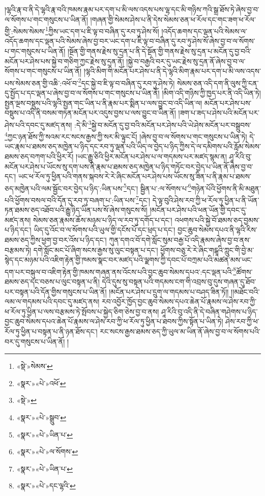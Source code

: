 །ལྷའི་རྣ་བ་ནི་དེ་ལྷའི་རྣ་བའི་ཁམས་རྣམ་པར་དག་པ་མི་ལས་འདས་པས་ལྷ་དང་མི་གཉིས་ཀའི་སྒྲ་ཐོས་ཏེ་ཞེས་བྱ་བ་ལ་སོགས་པ་གང་གསུངས་པ་ཡིན་ནོ། །གཞན་གྱི་སེམས་ཤེས་པ་ནི་དེས་སེམས་ཅན་ཕ་རོལ་དང་གང་ཟག་ཕ་རོལ་གྱི་:སེམས་སེམས་\footnote{«སྡེ་»སེམས་}ཀྱིས་ཡང་དག་པ་ཇི་ལྟ་བ་བཞིན་དུ་རབ་ཏུ་ཤེས་སོ། །འདོད་ཆགས་དང་ལྡན་པའི་སེམས་ལ་འདོད་ཆགས་དང་ལྡན་པའི་སེམས་ཞེས་བྱ་བར་ཡང་དག་པ་ཇི་ལྟ་བ་བཞིན་དུ་རབ་ཏུ་ཤེས་སོ་ཞེས་བྱ་བ་ལ་སོགས་པ་གང་གསུངས་པ་ཡིན་ནོ། །སྔོན་གྱི་གནས་རྗེས་སུ་དྲན་པ་ནི་དེ་སྔོན་གྱི་གནས་རྗེས་སུ་དྲན་པ་མངོན་དུ་བྱ་བའི་མངོན་པར་ཤེས་པས་སྐྱེ་བ་གཅིག་ཀྱང་རྗེས་སུ་དྲན་ནོ། །སྐྱེ་བ་བརྒྱའི་བར་དུ་ཡང་རྗེས་སུ་དྲན་ནོ་ཞེས་བྱ་བ་ལ་སོགས་པ་གང་གསུངས་པ་ཡིན་ནོ། །ལྷའི་མིག་གི་མངོན་པར་ཤེས་པ་ནི་དེ་ལྷའི་མིག་རྣམ་པར་དག་པ་མི་ལས་འདས་པས་སེམས་ཅན་གྱི་འཆི་:འཕོ་བ་\footnote{«སྣར་»«པེ་»འཕོ་}དང་སྐྱེ་བ་ཇི་ལྟ་བ་བཞིན་དུ་རབ་ཏུ་ཤེས་ཏེ། སེམས་ཅན་འདི་དག་ནི་ལུས་ཀྱི་ངན་དུ་སྤྱོད་པ་དང་ལྡན་པ་ཞེས་བྱ་བ་ལ་སོགས་པ་གང་གསུངས་པ་ཡིན་ནོ། །མིག་འདི་གཉིས་ཀྱི་ཁྱད་པར་ནི་འདི་ཡིན་ཏེ། སྤྱན་ལྔས་བསྡུས་པའི་ལྷའི་སྤྱན་གང་ཡིན་པ་ནི་རྣམ་པར་སྨིན་པ་ལས་བྱུང་བ་འདི་ཡིན་ལ། མངོན་པར་ཤེས་པས་བསྡུས་པ་འདི་ནི་བསམ་གཏན་མངོན་པར་འདུས་བྱས་པ་ལས་བྱུང་བ་ཡིན་ནོ། །ཟག་པ་ཟད་པ་ཤེས་པའི་མངོན་པར་ཤེས་པའི་དབང་དུ་མཛད་ནས། :དེ་མི་\footnote{«སྡེ་»}སྐྱེ་བ་མངོན་དུ་བྱ་བའི་མངོན་པར་ཤེས་པའི་ཡེ་ཤེས་མངོན་པར་བསྒྲུབས་\footnote{«སྣར་»«པེ་»སྒྲུབ་}ཀྱང་ཉན་ཐོས་ཀྱི་སའམ་རང་སངས་རྒྱས་ཀྱི་སར་མི་ལྟུང་ངོ། །ཞེས་བྱ་བ་ལ་སོགས་པ་གང་གསུངས་པ་ཡིན་ཏེ། དེ་ཡང་རྣམ་པ་ཐམས་ཅད་མཁྱེན་པ་ཉིད་དང་རབ་ཏུ་ལྡན་པའི་ཡིད་ལ་བྱེད་པ་ཉིད་ཀྱིས་དེ་ལ་དམིགས་པའི་རློམ་སེམས་ཐམས་ཅད་བཀག་པའི་ཕྱིར་རོ། །ཡང་རྒྱུ་ཅིའི་ཕྱིར་མངོན་པར་ཤེས་པ་ལ་གདམས་པར་མཛད་སྙམ་ན། ཤཱ་རིའི་བུ་མངོན་པར་ཤེས་པ་ཡོངས་སུ་དག་པས་ནི་རྣམ་པ་ཐམས་ཅད་མཁྱེན་པ་ཉིད་གཏོང་བར་བྱེད་པ་ཡིན་ནོ་ཞེས་བྱ་བ་དང་། ཡང་ཕ་རོལ་ཏུ་ཕྱིན་པའི་གནས་སྐབས་རེ་རེ་ཞིང་མངོན་པར་ཤེས་པས་ཡོངས་སུ་ཟིན་པ་ནི་རྣམ་པ་ཐམས་ཅད་མཁྱེན་པའི་ལམ་སྦྱོང་བར་བྱེད་པ་ཉིད་:ཡིན་པས་\footnote{«སྣར་»«པེ་»ཡིན་པ་}དང་། སྦྱིན་པ་:ལ་སོགས་པ་\footnote{«སྣར་»«པེ་»ལ་སོགས་}གཉེན་པོའི་ཕྱོགས་ནི་མི་མཐུན་པའི་ཕྱོགས་བསལ་བའི་དོན་དུ་རབ་ཏུ་བཞག་པ་:ཡིན་པས་\footnote{«སྣར་»«པེ་»ཡིན་པ་}དང་། དེ་ལྟ་བུའི་ཤེས་རབ་ཀྱི་ཕ་རོལ་ཏུ་ཕྱིན་པ་ནི་ཡོན་ཏན་ཐམས་ཅད་འཐོབ་པའི་རྒྱུ་ཉིད་ཡིན་པས་སོ་ཞེས་གསུངས་སོ། །མངོན་པར་ཤེས་པའི་ཕན་ཡོན་གྱི་དབང་དུ་མཛད་ནས། སེམས་ཅན་རྣམས་ཆོས་མཉམ་པ་ཉིད་ལ་རབ་ཏུ་དགོད་པ་དང་། འཕགས་པའི་སྐྱེ་བོ་ཐམས་ཅད་བྱམས་པ་ཉིད་དང་། ཡིད་དུ་འོང་བ་ལ་སོགས་པའི་ཡུལ་གྱི་དངོས་པོ་དང་ཕྲད་པ་དང་། བྱང་ཆུབ་སེམས་དཔའ་ནི་ལྷའི་རིས་ཐམས་ཅད་ཀྱིས་ཕྱག་བྱ་བར་འོས་པ་ཉིད་དང་། ཀུན་དགའ་བོ་དགེ་སློང་སུམ་བརྒྱ་པོ་འདི་རྣམས་ཞེས་བྱ་བ་ནས་བརྩམས་ཏེ། དགེ་སློང་མང་པོ་ཞིག་སངས་རྒྱས་སུ་ལུང་བསྟན་པ་དང་། ཕྱོགས་བཅུ་རེ་རེ་ཞིང་གངྒཱའི་ཀླུང་གི་བྱེ་མ་སྙེད་དང་མཉམ་པའི་འཇིག་རྟེན་གྱི་ཁམས་སྣང་བར་མཛད་པའི་ལྗགས་ཀྱི་དབང་པོ་བཀྲམ་པའི་མཚན་མས་ཡང་དག་པར་བསྐུལ་བ་འཇིག་རྟེན་གྱི་ཁམས་གཞན་ནས་འོངས་པའི་བྱང་ཆུབ་སེམས་དཔའ་:དང་ལྡན་པའི་\footnote{«སྣར་»«པེ་»དང་ལྷའི་}ཚོགས་ཐམས་ཅད་དང་བཅས་པ་ལུང་བསྟན་པ་ནི། དེའི་དུས་སུ་བསྟན་པའི་གདམས་ངག་གི་འབྲས་བུ་དུས་གཞན་དུ་ཐོབ་པར་བསྟན་པའི་དོན་གྱིས་གསུངས་པ་ཡིན་ནོ། །མངོན་པར་ཤེས་པ་དྲུག་ལ་གདམས་པ་བཤད་ཟིན་ཏོ།། །།མཐོང་བའི་ལམ་ལ་གདམས་པའི་དབང་དུ་མཛད་ནས། རབ་འབྱོར་ཁྱོད་བྱང་ཆུབ་སེམས་དཔའ་ཆེན་པོ་རྣམས་ལ་ཤེས་རབ་ཀྱི་ཕ་རོལ་ཏུ་ཕྱིན་པ་ལས་བརྩམས་ཏེ་སྤོབས་པ་སྐྱེད་ཅིག་ཅེས་བྱ་བ་ནས། ཤཱ་རིའི་བུ་འདི་ནི་དེ་བཞིན་གཤེགས་པ་ཉིད་བྱང་ཆུབ་སེམས་དཔའ་ཆེན་པོ་རྣམས་ལ་ཤེས་རབ་ཀྱི་ཕ་རོལ་ཏུ་ཕྱིན་པ་ཐབས་ཀྱིས་སྟོན་པ་ཡིན་ཏེ། ཤེས་རབ་ཀྱི་ཕ་རོལ་ཏུ་ཕྱིན་པ་བསྟན་པ་ནི་ཉན་ཐོས་དང་། རང་སངས་རྒྱས་ཐམས་ཅད་ཀྱི་ཡུལ་མ་ཡིན་ནོ་ཞེས་བྱ་བ་ལ་སོགས་པའི་བར་དུ་གསུངས་པ་ཡིན་ནོ། །
